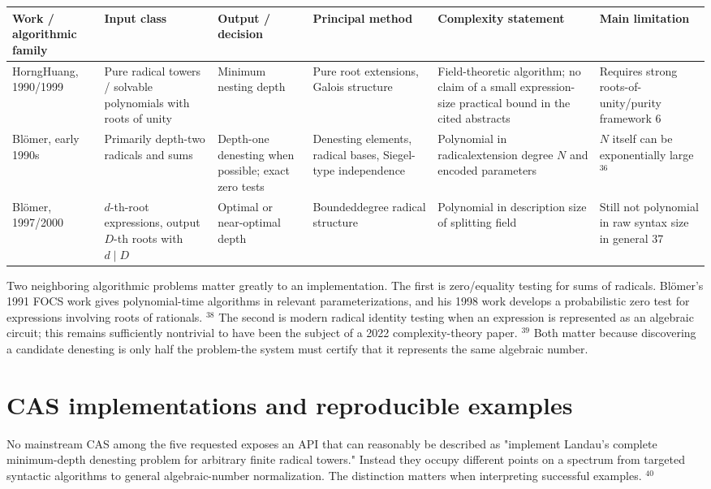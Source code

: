 \documentclass[10pt]{article}
\begin{document}
\begin{center}
\begin{tabular}[t]{|l|l|l|l|l|l|}
\hline
Work / algorithmic family & Input class & Output / decision & Principal method & Complexity statement & Main limitation \\
\hline
HorngHuang, 1990/1999 & Pure radical towers / solvable polynomials with roots of unity & Minimum nesting depth & Pure root extensions, Galois structure & Field-theoretic algorithm; no claim of a small expression-size practical bound in the cited abstracts & Requires strong roots-of-unity/purity framework 6 \\
\hline
Blömer, early 1990s & Primarily depth-two radicals and sums & Depth-one denesting when possible; exact zero tests & Denesting elements, radical bases, Siegel-type independence & Polynomial in radicalextension degree $N$ and encoded parameters & $N$ itself can be exponentially large ${ }^{36}$ \\
\hline
Blömer, 1997/2000 & $d$-th-root expressions, output $D$-th roots with $d \mid D$ & Optimal or near-optimal depth & Boundeddegree radical structure & Polynomial in description size of splitting field & Still not polynomial in raw syntax size in general 37 \\
\hline
\end{tabular}
\end{center}

Two neighboring algorithmic problems matter greatly to an implementation. The first is zero/equality testing for sums of radicals. Blömer's 1991 FOCS work gives polynomial-time algorithms in relevant parameterizations, and his 1998 work develops a probabilistic zero test for expressions involving roots of rationals. ${ }^{38}$ The second is modern radical identity testing when an expression is represented as an algebraic circuit; this remains sufficiently nontrivial to have been the subject of a 2022 complexity-theory paper. ${ }^{39}$ Both matter because discovering a candidate denesting is only half the problem-the system must certify that it represents the same algebraic number.

\section*{CAS implementations and reproducible examples}
No mainstream CAS among the five requested exposes an API that can reasonably be described as "implement Landau's complete minimum-depth denesting problem for arbitrary finite radical towers." Instead they occupy different points on a spectrum from targeted syntactic algorithms to general algebraic-number normalization. The distinction matters when interpreting successful examples. ${ }^{40}$
\end{document}
